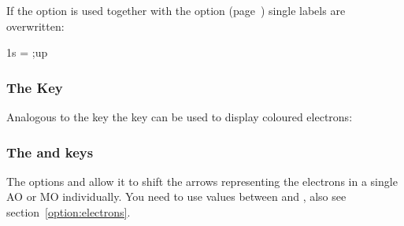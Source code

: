 \documentclass[load-preamble+]{cnltx-doc}
\begin{document}
If the option is used together with the  option
(page~\pageref{option:labels}) single labels are overwritten:
\begin{example}
  \begin{modiagram}[labels]
     { 1s = {;up} }
  \end{modiagram}
\end{example}

\subsubsection{The  Key}\label{sec:key:color}
Analogous to the  key the  key can be used to
display coloured electrons:
\begin{example}
  \begin{modiagram}[labels-fs=\footnotesize]
  \end{modiagram}
\end{example}

\subsubsection{The  and  keys}\label{sec:key:electrons}
The options  and  allow it to shift the
arrows representing the electrons in a single \ac{AO} or \ac{MO} individually.
You need to use values between  and , also see
section~\ref{option:electrons}.
\begin{example}
  \begin{modiagram}
  \end{modiagram}
\end{example}
\end{document}
